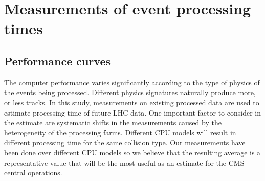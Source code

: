 \documentclass[a4paper]{jpconf}
\begin{document}
\section{Measurements of event processing times}

\subsection{Performance curves}

The computer performance varies significantly according to the type of physics of the events being processed. Different physics signatures naturally produce more, or less tracks. In this study, measurements on existing processed data are used to estimate processing time of future LHC data. One important factor to consider in the estimate are systematic shifts in the measurements caused by the heterogeneity of the processing farms. Different CPU models will result in different processing time for the same collision type. Our measurements have been done over different CPU models so we believe that the resulting average is a representative value that will be the most useful as an estimate for the CMS central operations.
\end{document}
